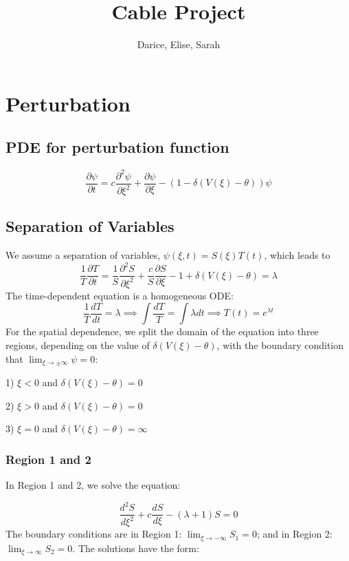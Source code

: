 \documentclass[12pt]{article}
\title{Cable Project}
\author{Darice, Elise, Sarah}
\begin{document}
\maketitle
\section{Perturbation}
\subsection{PDE for perturbation function}

\begin{equation} \label{pde_nh}
\frac{\partial \psi}{\partial t} = c \frac{\partial^2\psi}{\partial\xi^2} + \frac{\partial\psi}{\partial\xi} - (1 - \delta(V(\xi)-\theta))\psi
\end{equation} 


\subsection{Separation of Variables}
We assume a separation of variables, $\psi(\xi,t) = S(\xi)T(t)$, which leads to
$$ \frac{1}{T}\frac{\partial T}{\partial t} = \frac{1}{S}\frac{\partial^2S}{\partial\xi^2} + \frac{c}{S}\frac{\partial S}{\partial\xi} - 1 + \delta(V(\xi)-\theta)= \lambda $$
The time-dependent equation is a homogeneous ODE:
\begin{equation} \label{timeeq}
\frac{1}{T}\frac{dT}{dt} = \lambda \implies \int\frac{dT}{T} = \int\lambda dt \implies T(t)=e^{\lambda t}
\end{equation}
For the spatial dependence, we split the domain of the equation into three regions, depending on the value of $\delta(V(\xi)-\theta)$, with the boundary condition that $\lim_{\xi \to \pm \infty}\psi = 0$:

1) $\xi < 0$ and $\delta(V(\xi)-\theta) = 0$

2) $\xi > 0$ and $\delta(V(\xi)-\theta) = 0$ 

3) $\xi = 0$ and $\delta(V(\xi)-\theta) = \infty$

\subsubsection{ Region 1 and 2}
In Region 1 and 2, we solve the equation:

\begin{equation}\label{spatial0}
\frac{d^2S}{d\xi^2} + c\frac{dS}{d\xi} - (\lambda + 1)S = 0
\end{equation} 
The boundary conditions are in Region 1: $\lim_{\xi \to -\infty}S_1 = 0$; and in Region 2: $\lim_{\xi \to \infty}S_2 = 0$. The solutions have the form:
\end{document}
